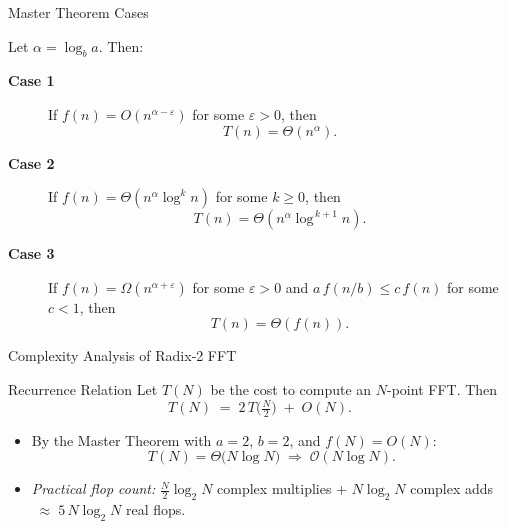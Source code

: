 \documentclass[12pt]{beamer}
\begin{document}
\begin{frame}{Master Theorem Cases}
  \begin{block}{Let \(\alpha=\log_b a\). Then:}
    \begin{description}
      \item[\textbf{Case 1}] If \(f(n)=O(n^{\alpha-\varepsilon})\) for some \(\varepsilon>0\), then
        \[
          T(n)=\Theta(n^{\alpha}).
        \]
      \item[\textbf{Case 2}] If \(f(n)=\Theta(n^{\alpha}\log^k n)\) for some \(k\ge0\), then
        \[
          T(n)=\Theta(n^{\alpha}\log^{\,k+1}n).
        \]
      \item[\textbf{Case 3}] If 
        \(f(n)=\Omega(n^{\alpha+\varepsilon})\) for some \(\varepsilon>0\)
        and \(a\,f(n/b)\le c\,f(n)\) for some \(c<1\), then
        \[
          T(n)=\Theta(f(n)).
        \]
    \end{description}
  \end{block}
\end{frame}


\begin{frame}{Complexity Analysis of Radix‑2 FFT}
  \begin{block}{Recurrence Relation}
    Let \(T(N)\) be the cost to compute an \(N\)-point FFT.  Then
    \[
      T(N) \;=\; 2\,T\!\bigl(\tfrac N2\bigr)\;+\;O(N).
    \]
  \end{block}

  \begin{itemize}
    \item By the Master Theorem with \(a=2\), \(b=2\), and \(f(N)=O(N)\):
      \[
        T(N) = \Theta\bigl(N\log N\bigr)
        \;\Longrightarrow\;
        \mathcal{O}(N\log N).
      \]
    \item \emph{Practical flop count:}  
      \(\tfrac N2\log_2N\) complex multiplies + \(N\log_2N\) complex adds  
      \(\;\approx\;5\,N\log_2N\) real flops.
  \end{itemize}
\end{frame}
\end{document}
